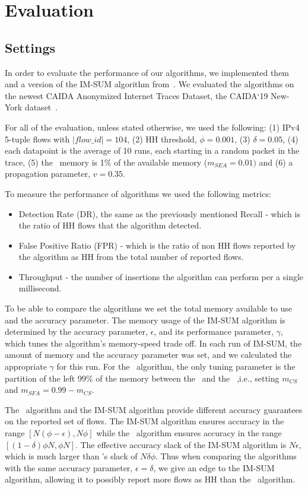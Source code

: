 \section{Evaluation}
\label{sec:evaluation}
\subsection{Settings}
In order to evaluate the performance of our algorithms, we implemented them and a version of the IM-SUM algorithm from~\cite{basat2017optimal}. We evaluated the algorithms on the newest CAIDA Anonymized Internet Traces Dataset, the CAIDA`19 New-York dataset~\cite{CAIDA2019}.

For all of the evaluation, unless stated otherwise, we used the following: (1) IPv4 5-tuple flows with $|flow\_id|=104$, (2) HH threshold, $\phi=0.001$, (3) $\delta=0.05$, (4) each datapoint is the average of 10 runs, each starting in a random packet in the trace, (5) the \sea\ memory is 1\% of the available memory ($m_{SEA}=0.01)$ and (6) a propagation parameter, $v=0.35$.

To measure the performance of algorithms we used the following metrics:
\begin{itemize}
    \item Detection Rate (DR), the same as the previously mentioned Recall - which is the ratio of HH flows that the algorithm detected.
    \item False Positive Ratio (FPR) - which is the ratio of non HH flows reported by the algorithm as HH from the total number of reported flows.
    \item Throughput - the number of insertions the algorithm can perform per a single millisecond.
\end{itemize}

To be able to compare the algorithms we set the total memory available to use and the accuracy parameter. The memory usage of the IM-SUM algorithm is determined by the accuracy parameter, $\epsilon$, and its performance parameter, $\gamma$, which tunes the algorithm's memory-speed trade off.
In each run of IM-SUM, the amount of memory and the accuracy parameter was set, and we calculated the appropriate $\gamma$ for this run. For the \cs\ algorithm, the only tuning parameter is the partition of the left 99\% of the memory between the \cs\ and the \sfa\ ,i.e., setting $m_{CS}$ and $m_{SFA}=0.99-m_{CS}$.

The \cs\ algorithm and the IM-SUM algorithm provide different accuracy guarantees on the reported set of flows. The IM-SUM algorithm ensures accuracy in the range $[N(\phi-\epsilon),N \phi]$ while the \cs\ algorithm ensures accuracy in the range $[(1-\delta)\phi N, \phi N]$. The effective accuracy slack of the IM-SUM algorithm is $N\epsilon$, which is much larger than \cs's slack of $N\delta\phi$. Thus when comparing the algorithms with the same accuracy parameter, $\epsilon=\delta$, we give an edge to the IM-SUM algorithm, allowing it to possibly report more flows as HH than the \cs\ algorithm.

